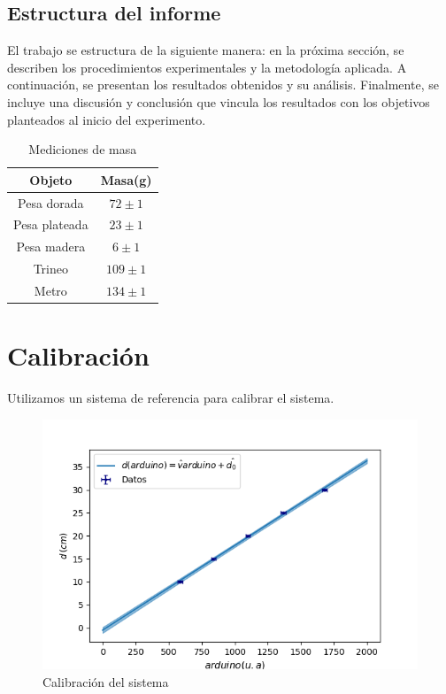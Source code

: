\documentclass[12pt,a4]{article}
\begin{document}
\subsection{Estructura del informe}

El trabajo se estructura de la siguiente manera: en la próxima sección, se describen los procedimientos experimentales y la metodología aplicada. A continuación, se presentan los resultados obtenidos y su análisis. Finalmente, se incluye una discusión y conclusión que vincula los resultados con los objetivos planteados al inicio del experimento.

\begin{table}
    \centering
    \begin{tabular}{|c|c|}
        \hline
        \textbf{Objeto} & \textbf{Masa(g)} \\
        \hline
        Pesa dorada & $72 \pm 1$ \\
        Pesa plateada & $23 \pm 1$ \\
        Pesa madera & $6 \pm 1$ \\
        Trineo & $109 \pm 1$ \\
        Metro & $134 \pm 1$ \\
        \hline
    \end{tabular}
    \caption{Mediciones de masa}
    \label{tab:mediciones}
\end{table}

\newpage
\section{Calibración}

Utilizamos un sistema de referencia para calibrar el sistema.

\begin{figure}[H]
    \centering
    \includegraphics[width=0.9\linewidth]{Calibracion.png}
    \caption{Calibración del sistema}
    \label{fig:calibracion}
\end{figure}
\end{document}
